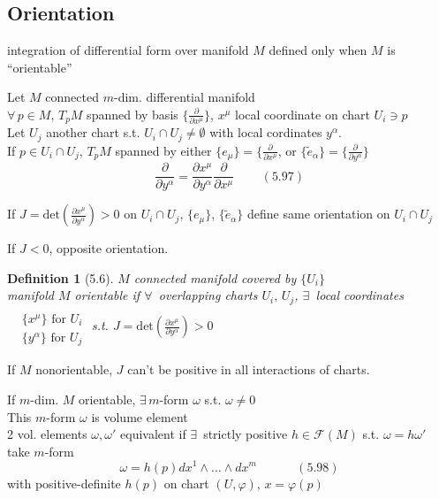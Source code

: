 \documentclass{book}
\newtheorem{definition}{Definition}
\begin{document}
\subsection{ Orientation }

integration of differential form over manifold $M$ defined only when $M$ is ``orientable''

Let $M$ connected $m$-dim. differential manifold \\
$\forall \, p \in M$, $T_pM$ spanned by basis $\lbrace \frac{ \partial }{ \partial x^{\mu} } \rbrace$, $x^{\mu}$ local coordinate on chart $U_i \ni p$ \\
Let $U_j$ another chart s.t. $U_i \cap U_j \neq \emptyset$ with local cordinates $y^{\alpha}$. \\
If $p \in U_i \cap U_j$, $T_pM$ spanned by either $\lbrace e_{\mu} \rbrace = \lbrace \frac{ \partial }{ \partial x^{\mu} }$, or $\lbrace \widetilde{e}_{\alpha} \rbrace = \lbrace \frac{ \partial }{ \partial y^{\alpha} } \rbrace$
\begin{equation}
  \frac{ \partial }{ \partial y^{\alpha} } = \frac{ \partial x^{\mu} }{ \partial y^{\alpha}} \frac{ \partial }{ \partial x^{\mu} } \quad \quad \, (5.97)
\end{equation}

If $J = \text{det}{ \left( \frac{ \partial x^{\mu} }{ \partial y^{\alpha}} \right)} >0$ on $U_i \cap U_j$, $\lbrace e_{\mu} \rbrace$, $\lbrace \widetilde{e}_{\alpha} \rbrace$ define same orientation on $U_i \cap U_j$

If $J <0$, opposite orientation.  



\begin{definition}[5.6]
$M$ connected manifold covered by $\lbrace U_i \rbrace$ \\
manifold $M$ orientable if $\forall \, $ overlapping charts $U_i, \, U_j$, $\exists \, $ local coordinates $\begin{aligned} & \quad \\
  & \lbrace x^{\mu} \rbrace \text{ for } U_i \\ 
  & \lbrace y^{\alpha} \rbrace \text{ for } U_j \end{aligned}$ s.t. $J = \text{det}{ \left( \frac{ \partial x^{\mu} }{ \partial y^{\alpha}} \right) } > 0$
\end{definition}

If $M$ nonorientable, $J$ can't be positive in all interactions of charts.  

If $m$-dim. $M$ orientable, $\exists \, m$-form $\omega$ s.t. $\omega\neq 0$ \\
This $m$-form $\omega$ is volume element \\
2 vol. elements $\omega, \omega'$ equivalent if $\exists \, $ strictly positive $h \in \mathcal{F}(M)$ s.t. $\omega = h\omega'$ \\
take $m$-form
\begin{equation}
  \omega = h(p) dx^1 \wedge \dots \wedge dx^m \quad \quad \quad \, (5.98)
\end{equation}
with positive-definite $h(p)$ on chart $(U,\varphi)$, $x = \varphi(p)$
\end{document}
